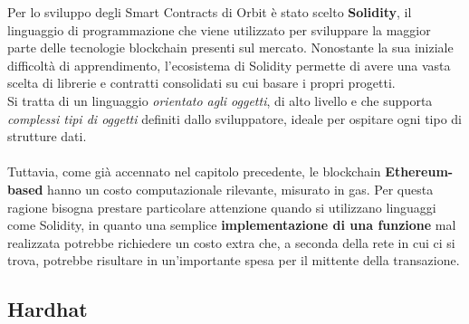 \documentclass[12pt,a4paper]{report}
\begin{document}
Per lo sviluppo degli Smart Contracts di Orbit è stato scelto \textbf{Solidity}\cite{solidty}, il linguaggio di programmazione che viene utilizzato per sviluppare la maggior parte delle tecnologie blockchain presenti sul mercato. Nonostante la sua iniziale difficoltà di apprendimento, l'ecosistema di Solidity permette di avere una vasta scelta di librerie e contratti consolidati su cui basare i propri progetti.
\\Si tratta di un linguaggio \textit{orientato agli oggetti}, di alto livello e che supporta \textit{complessi tipi di oggetti} definiti dallo sviluppatore, ideale per ospitare ogni tipo di strutture dati.
\\\\Tuttavia, come già accennato nel capitolo precedente, le blockchain \textbf{Ethereum-based} hanno un costo computazionale rilevante, misurato in gas. Per questa ragione bisogna prestare particolare attenzione quando si utilizzano linguaggi come Solidity, in quanto una semplice \textbf{implementazione di una funzione} mal realizzata potrebbe richiedere un costo extra che, a seconda della rete in cui ci si trova, potrebbe risultare in un'importante spesa per il mittente della transazione.

\subsection{Hardhat}
\end{document}
